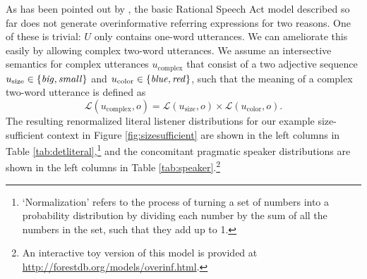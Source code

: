 \documentclass[11pt]{article}
\newcommand{\jd}[1]{\textcolor{Red}{[jd: #1]}}
\newcommand{\ndg}[1]{\textcolor{Green}{[ndg: #1]}}
\newcommand{\tableref}[1]{Table \ref{#1}}
\newcommand{\figref}[1]{Figure \ref{#1}}
\newcommand{\sectionref}[1]{Section \ref{#1}}
\begin{document}
As has been pointed out by , the basic Rational Speech Act model described so far \cite{frank2012} does not generate overinformative referring expressions for two reasons. 
One of these is trivial: $U$ only contains one-word utterances. We can ameliorate this easily by allowing complex two-word utterances. We assume an intersective semantics for complex utterances $u_{\textrm{complex}}$ that consist of a two adjective sequence $u_{\textrm{size}} \in \{\textrm{\emph{big}}, \textrm{\emph{small}}\}$ and $u_{\textrm{color}} \in \{\textrm{\emph{blue}}, \textrm{\emph{red}}\}$, such that the meaning of a complex two-word utterance is defined as
\begin{equation} 
\label{eq:prodcomp}
\mathcal{L}(u_{\text{complex}},o) = \mathcal{L}(u_{\text{size}},o) \times \mathcal{L}(u_{\text{color}},o).
\end{equation} 
The resulting renormalized literal listener distributions for our example size-sufficient context in \figref{fig:sizesufficient} are shown in the left columns in \tableref{tab:detliteral},\footnote{`Normalization' refers to the process of turning a set of numbers into a probability distribution by dividing each number by the sum of all the numbers in the set, such that they add up to 1.} and the concomitant pragmatic speaker distributions are shown in the left columns in \tableref{tab:speaker}.\footnote{An interactive toy version of this model is provided at \url{http://forestdb.org/models/overinf.html}.}
\end{document}
